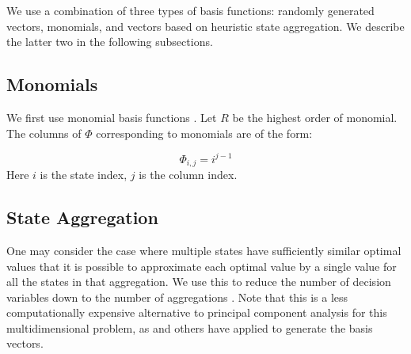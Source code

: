 \documentclass[conference]{IEEEtran}
\begin{document}
We use a combination of three types of basis functions: randomly generated vectors, monomials, and vectors based on heuristic state aggregation. We describe the latter two in the following subsections.

\subsection{Monomials}
    We first use monomial basis functions \cite{bertsekas1995dynamic,478953}. Let $R$ be the highest order of monomial. The columns of $\Phi$ corresponding to monomials are of the form:
	
	\begin{displaymath}
        \Phi_{i,j}=i^{j-1}
    \end{displaymath} Here $i$ is the state index, $j$ is the column index. %



 \subsection{State Aggregation}
    
    One may consider the case where multiple states have sufficiently similar optimal values that it is possible to approximate each optimal value by a single value for all the states in that aggregation. We use this to reduce the number of decision variables down to the number of aggregations \cite{5717627}. Note that this is a less computationally expensive alternative to principal component analysis for this multidimensional problem, as \cite{PCA2015} and others have applied to generate the basis vectors.%
    
\end{document}
